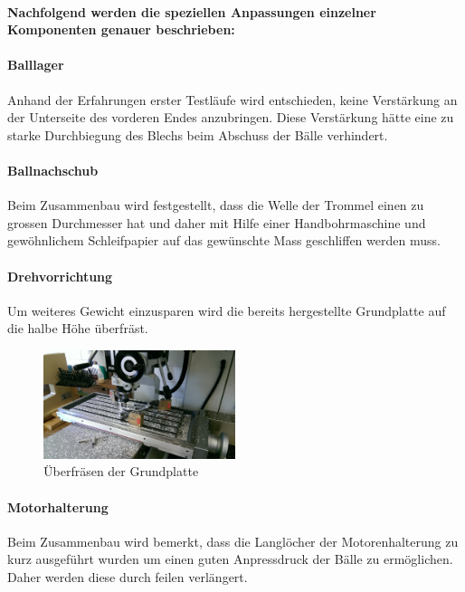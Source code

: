 \paragraph{Nachfolgend werden die speziellen Anpassungen einzelner Komponenten genauer beschrieben:}

\paragraph{Balllager}
Anhand der Erfahrungen erster Testläufe wird entschieden, keine Verstärkung an 
der Unterseite des vorderen Endes anzubringen. Diese Verstärkung hätte eine zu 
starke Durchbiegung des Blechs beim Abschuss der Bälle verhindert.

\paragraph{Ballnachschub}
Beim Zusammenbau wird festgestellt, dass die Welle der Trommel einen zu 
grossen Durchmesser hat und daher mit Hilfe einer Handbohrmaschine und 
gewöhnlichem Schleifpapier auf das gewünschte Mass geschliffen werden muss.

\paragraph{Drehvorrichtung}
Um weiteres Gewicht einzusparen wird die bereits hergestellte Grundplatte auf 
die halbe Höhe überfräst.

\begin{figure}[h!]
	\centering
	\includegraphics[width=0.5\textwidth]{fig/IMAG0357.jpg}
	\caption{Überfräsen der Grundplatte}
	\label{fig:Grundplatte fräsen}
\end{figure}

\paragraph{Motorhalterung}
Beim Zusammenbau wird bemerkt, dass die Langlöcher der Motorenhalterung zu 
kurz ausgeführt wurden um einen guten Anpressdruck der Bälle zu ermöglichen. 
Daher werden diese durch feilen verlängert.

